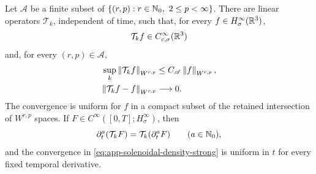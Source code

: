 \begin{lemma}
\label{lem:app-solenoidal-density}
Let \(\mathscr A\) be a finite subset of
\(\{(r,p):r\in\Nzero,\ 2\le p<\infty\}\).  There are linear operators
\(\mathcal T_k\), independent of time, such that, for every
\(f\in H^\infty_\sigma(\mathbb R^3)\),
\[
 \mathcal T_kf\in C_{c,\sigma}^\infty(\mathbb R^3)
\]
and, for every \((r,p)\in\mathscr A\),
\begin{align}
 \sup_k\left\lVert \mathcal T_kf\right\rVert_{W^{r,p}}
 &\le C_{\mathscr A}\left\lVert f\right\rVert_{W^{r,p}},
 \label{eq:app-solenoidal-density-uniform}\\
 \left\lVert \mathcal T_kf-f\right\rVert_{W^{r,p}}&\longrightarrow0.
 \label{eq:app-solenoidal-density-strong}
\end{align}
The convergence is uniform for \(f\) in a compact subset of the retained
intersection of \(W^{r,p}\) spaces.  If
\(F\in C^\infty([0,T];H^\infty_\sigma)\), then
\begin{equation}
 \partial_t^a(\mathcal T_kF)=\mathcal T_k(\partial_t^aF)
 \qquad(a\in\mathbb N_0),
 \label{eq:app-solenoidal-density-time}
\end{equation}
and the convergence in
\eqref{eq:app-solenoidal-density-strong} is uniform in \(t\) for every
fixed temporal derivative.
\end{lemma}

